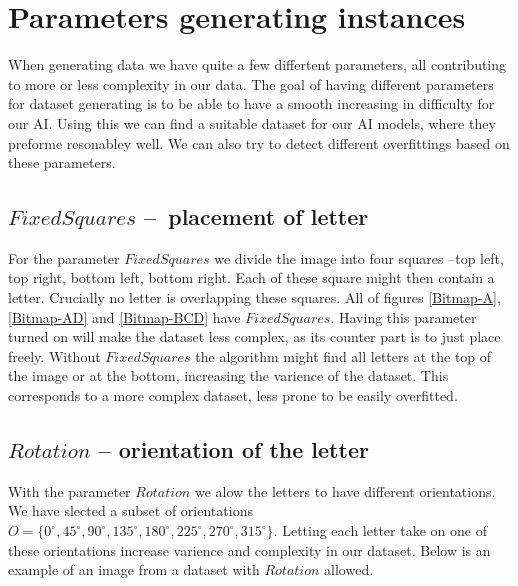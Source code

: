 \section{Parameters generating instances}
\label{ParametersGenDataset}
When generating data we have quite a few differtent parameters, all contributing to more or less complexity
in our data. The goal of having different parameters for dataset generating is to be able to have a smooth increasing 
in difficulty for our AI. Using this we can find a suitable dataset for our AI models, where they preforme resonabley well. 
We can also try to detect different overfittings based on these parameters.

\subsection{$FixedSquares$ – placement of letter}
For the parameter $FixedSquares$ we divide the image into four squares –top left, top right, bottom left, bottom right. 
Each of these square might then contain a letter. Crucially no letter is overlapping these squares.
All of figures \ref{Bitmap-A},  \ref{Bitmap-AD} and \ref{Bitmap-BCD} have $FixedSquares$.
Having this parameter turned on will make the dataset less complex, as its counter part is to just place freely.
Without $FixedSquares$ the algorithm might find all letters at the top of the image or at the bottom, increasing the
varience of the dataset. This corresponds to a more complex dataset, less prone to be easily overfitted.


\subsection{$Rotation$ – orientation of the letter}
With the parameter $Rotation$ we alow the letters to have different orientations. 
We have slected a subset of orientations $O=\{ 0 ^{\circ}, 45^{\circ}, 90^{\circ}, 135^{\circ}, 180^{\circ}, 225^{\circ},270^{\circ},315^{\circ}\}$. 
Letting each letter take on one of these orientations increase varience and complexity in our dataset. 
Below is an example of an image from a dataset with $Rotation$ allowed.
 
